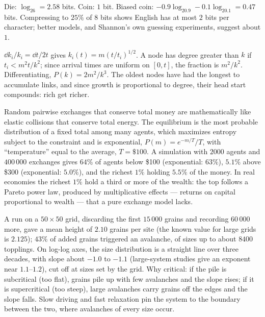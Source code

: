  Die: $\log_26 = 2.58$ bits. Coin: $1$ bit. Biased coin: $-0.9\log_20.9 - 0.1\log_20.1 = 0.47$ bits. Compressing to $25\%$ of $8$ bits shows English has at most $2$ bits per character; better models, and Shannon's own guessing experiments, suggest about $1$.

 $\dd k_i/k_i = \dd t/2t$ gives $k_i(t) = m(t/t_i)^{1/2}$. A node has degree greater than $k$ if $t_i<m^2t/k^2$; since arrival times are uniform on $[0,t]$, the fraction is $m^2/k^2$. Differentiating, $P(k) = 2m^2/k^3$. The oldest nodes have had the longest to accumulate links, and since growth is proportional to degree, their head start compounds: rich get richer.

 Random pairwise exchanges that conserve total money are mathematically like elastic collisions that conserve total energy. The equilibrium is the most probable distribution of a fixed total among many agents, which maximizes entropy subject to the constraint and is exponential, $P(m) = e^{-m/T}/T$, with ``temperature'' equal to the average, $T = \$100$. A simulation with $2000$ agents and $400\,000$ exchanges gives $64\%$ of agents below \$100 (exponential: $63\%$), $5.1\%$ above \$300 (exponential: $5.0\%$), and the richest $1\%$ holding $5.5\%$ of the money. In real economies the richest $1\%$ hold a third or more of the wealth: the top follows a Pareto power law, produced by multiplicative effects --- returns on capital proportional to wealth --- that a pure exchange model lacks.

 A run on a $50\times50$ grid, discarding the first $15\,000$ grains and recording $60\,000$ more, gave a mean height of $2.10$ grains per site (the known value for large grids is $2.125$); $43\%$ of added grains triggered an avalanche, of sizes up to about $8400$ topplings. On log-log axes, the size distribution is a straight line over three decades, with slope about $-1.0$ to $-1.1$ (large-system studies give an exponent near $1.1$--$1.2$), cut off at sizes set by the grid. Why critical: if the pile is subcritical (too flat), grains pile up with few avalanches and the slope rises; if it is supercritical (too steep), large avalanches carry grains off the edges and the slope falls. Slow driving and fast relaxation pin the system to the boundary between the two, where avalanches of every size occur.
